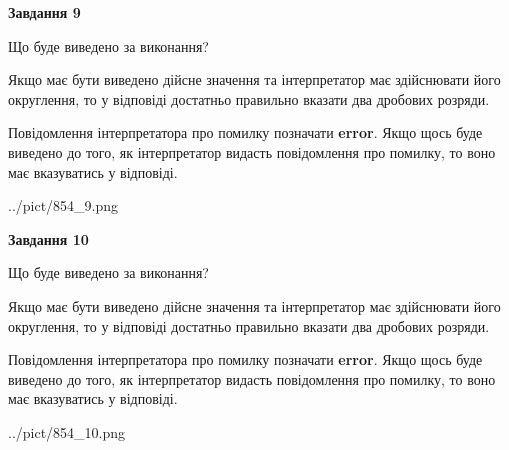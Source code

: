 \documentclass[12pt, ukrainian]{article}
\begin{document}
{\begin {Large}
{\begin {center}\textbf{Завдання 9}\end {center}}\par
Що буде виведено за виконання? \par

Якщо має бути виведено дійсне значення та інтерпретатор має здійснювати його округлення, 
то у відповіді достатньо правильно вказати два дробових розряди.

Повідомлення інтерпретатора про помилку позначати \textbf{error}.
Якщо щось буде виведено до того, як інтерпретатор видасть повідомлення про помилку, 
то воно має вказуватись у відповіді. \par

\begin{center}
	{../pict/854_9.png}
\end{center}
\newpage

{\begin {center}\textbf{Завдання 10}\end {center}}\par
Що буде виведено за виконання? \par

Якщо має бути виведено дійсне значення та інтерпретатор має здійснювати його округлення, 
то у відповіді достатньо правильно вказати два дробових розряди.

Повідомлення інтерпретатора про помилку позначати \textbf{error}.
Якщо щось буде виведено до того, як інтерпретатор видасть повідомлення про помилку, 
то воно має вказуватись у відповіді. \par

\begin{center}
	{../pict/854_10.png}
\end{center}
\newpage

\end {Large}}
\end{document}
